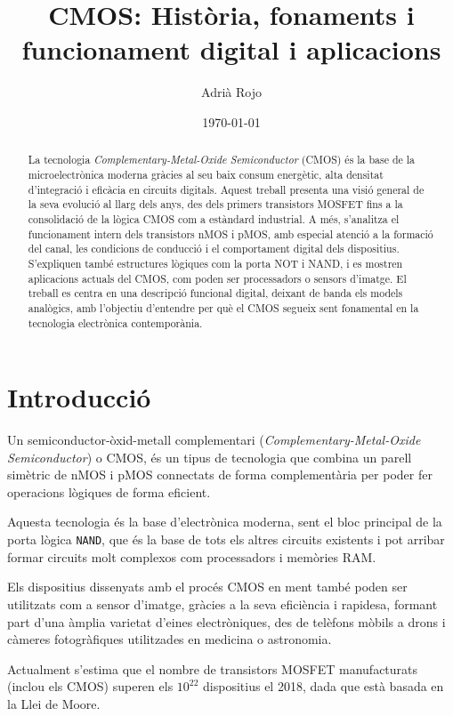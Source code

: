 \documentclass[11pt,a4paper]{article}
\title{\textbf{CMOS: Història, fonaments i funcionament digital i aplicacions}}
\author{Adrià Rojo}
\date{\today}
\begin{document}
\maketitle
\thispagestyle{empty}
\begin{abstract}
La tecnologia \textit{Complementary-Metal-Oxide Semiconductor} (CMOS) és la base de la microelectrònica moderna gràcies al seu baix consum energètic, alta densitat d'integració i eficàcia en circuits digitals. Aquest treball presenta una visió general de la seva evolució al llarg dels anys, des dels primers transistors MOSFET fins a la consolidació de la lògica CMOS com a estàndard industrial. A més, s'analitza el funcionament intern dels transistors nMOS i pMOS, amb especial atenció a la formació del canal, les condicions de conducció i el comportament digital dels dispositius. S'expliquen també estructures lògiques com la porta NOT i NAND, i es mostren aplicacions actuals del CMOS, com poden ser processadors o sensors d'imatge. El treball es centra en una descripció funcional digital, deixant de banda els models analògics, amb l’objectiu d’entendre per què el CMOS segueix sent fonamental en la tecnologia electrònica contemporània.
\end{abstract}


\section{Introducció}

Un semiconductor-òxid-metall complementari (\textit{Complementary-Metal-Oxide Semiconductor}) o CMOS, és un tipus de tecnologia que combina un parell simètric de nMOS i pMOS connectats de forma complementària per poder fer operacions lògiques de forma eficient\autocite{wiki:CMOS}. 

Aquesta tecnologia és la base d'electrònica moderna, sent el bloc principal de la porta lògica \texttt{NAND}, que és la base de tots els altres circuits existents i pot arribar formar circuits molt complexos com processadors i memòries RAM.

Els dispositius dissenyats amb el procés CMOS en ment també poden ser utilitzats com a sensor d'imatge, gràcies a la seva eficiència i rapidesa, formant part d'una àmplia varietat d'eines electròniques, des de telèfons mòbils a drons i càmeres fotogràfiques utilitzades en medicina o astronomia. 

Actualment s'estima que el nombre de transistors MOSFET manufacturats (inclou els CMOS) superen els $10^{22}$ dispositius \autocite{wiki:Transistor_count} el 2018, dada que està basada en la Llei de Moore.
\end{document}
